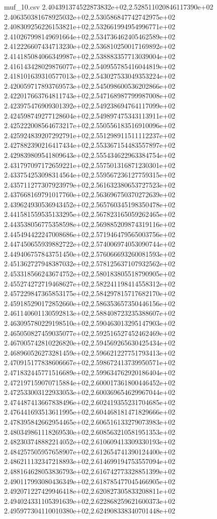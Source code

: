 \begin{filecontents*}{muf_10.csv}
2.404391374522873832e+02,2.528511020846117390e+02
2.406350381678925032e+02,2.530586847742742975e+02
2.408309256226153821e+02,2.532661994954996771e+02
2.410267998149691664e+02,2.534736462405462589e+02
2.412226607434713230e+02,2.536810250017169892e+02
2.414185084066349987e+02,2.538883357713039004e+02
2.416143428029876077e+02,2.540955785416044819e+02
2.418101639310577013e+02,2.543027533049353224e+02
2.420059717893769573e+02,2.545098600536202866e+02
2.422017663764811743e+02,2.547168987799987008e+02
2.423975476909301392e+02,2.549238694764117099e+02
2.424598749277128604e+02,2.549897475343113911e+02
2.425222008564673217e+02,2.550556183516910096e+02
2.425924839207292791e+02,2.551298911511112237e+02
2.427882390216417434e+02,2.553367154483557897e+02
2.429839809541809643e+02,2.555434622963384754e+02
2.431797097172659221e+02,2.557501316871230301e+02
2.433754253098314564e+02,2.559567236127759315e+02
2.435711277307923979e+02,2.561632380653727523e+02
2.437668169791017760e+02,2.563696750370272639e+02
2.439624930536943452e+02,2.565760345198350478e+02
2.441581559535133295e+02,2.567823165059262465e+02
2.443538056775358598e+02,2.569885209874319116e+02
2.445494422247008686e+02,2.571946479565003756e+02
2.447450655939882722e+02,2.574006974053090744e+02
2.449406757843751450e+02,2.576066693260081593e+02
2.451362727948387032e+02,2.578125637107932562e+02
2.453318566243674752e+02,2.580183805518790905e+02
2.455274272719468627e+02,2.582241198414558312e+02
2.457229847365853175e+02,2.584297815717682170e+02
2.459185290172852660e+02,2.586353657350446156e+02
2.461140601130592813e+02,2.588408723235388607e+02
2.463095780229198510e+02,2.590463013295147903e+02
2.465050827459035077e+02,2.592516527452462469e+02
2.467005742810226820e+02,2.594569265630425434e+02
2.468960526273281459e+02,2.596621227751793413e+02
2.470915177838606667e+02,2.598672413739950571e+02
2.471832445771516689e+02,2.599634762920186404e+02
2.472197159070715884e+02,2.600017361800446452e+02
2.472533003122933053e+02,2.600369654629967044e+02
2.474487413667838496e+02,2.602419355231704685e+02
2.476441693513611995e+02,2.604468181471829666e+02
2.478395842662954465e+02,2.606516133279073983e+02
2.480349861118269530e+02,2.608563210581951353e+02
2.482303748882214052e+02,2.610609413309330193e+02
2.484257505957658907e+02,2.612654741390124400e+02
2.486211132347218893e+02,2.614699194753557094e+02
2.488164628053836793e+02,2.616742773328851399e+02
2.490117993080436349e+02,2.618785477045466905e+02
2.492071227429946418e+02,2.620827305833208811e+02
2.494024331105391639e+02,2.622868259621600373e+02
2.495977304110010380e+02,2.624908338340701448e+02

\end{filecontents*}
